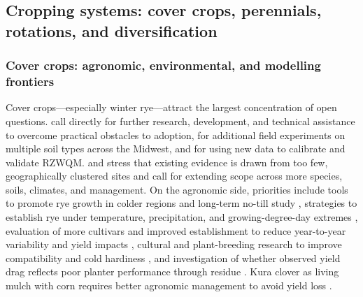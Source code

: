 \subsection{Cropping systems: cover crops, perennials, rotations, and diversification}

\subsubsection{Cover crops: agronomic, environmental, and modelling frontiers}

Cover crops---especially winter rye---attract the largest concentration of open questions. \textcite{Kladivko2014} call directly for further research, development, and technical assistance to overcome practical obstacles to adoption, for additional field experiments on multiple soil types across the Midwest, and for using new data to calibrate and validate RZWQM. \textcite{Birru2023} and \textcite{Zhao2016} stress that existing evidence is drawn from too few, geographically clustered sites and call for extending scope across more species, soils, climates, and management. On the agronomic side, priorities include tools to promote rye growth in colder regions and long-term no-till study \parencite{Waring2020}, strategies to establish rye under temperature, precipitation, and growing-degree-day extremes \parencite{Bawa2023}, evaluation of more cultivars and improved establishment to reduce year-to-year variability and yield impacts \parencite{Kaspar2007}, cultural and plant-breeding research to improve compatibility and cold hardiness \parencite{Dinnes2002,Liu2019}, and investigation of whether observed yield drag reflects poor planter performance through residue \parencite{Dougherty2020}. Kura clover as living mulch with corn requires better agronomic management to avoid yield loss \parencite{Qi2011b,Qi2011}.

